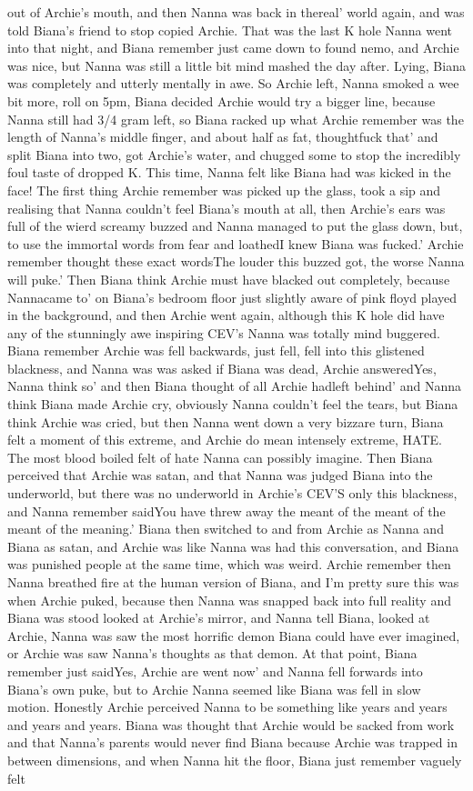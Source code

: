 \documentclass[12pt]{book}
\begin{document}
out of Archie's mouth, and then Nanna was back in thereal' world again, and was told Biana's friend to stop copied Archie. That was the last K hole Nanna went into that night, and Biana remember just came down to found nemo, and Archie was nice, but Nanna was still a little bit mind mashed the day after. Lying, Biana was completely and utterly mentally in awe. So Archie left, Nanna smoked a wee bit more, roll on 5pm, Biana decided Archie would try a bigger line, because Nanna still had 3/4 gram left, so Biana racked up what Archie remember was the length of Nanna's middle finger, and about half as fat, thoughtfuck that' and split Biana into two, got Archie's water, and chugged some to stop the incredibly foul taste of dropped K. This time, Nanna felt like Biana had was kicked in the face! The first thing Archie remember was picked up the glass, took a sip and realising that Nanna couldn't feel Biana's mouth at all, then Archie's ears was full of the wierd screamy buzzed and Nanna managed to put the glass down, but, to use the immortal words from fear and loathedI knew Biana was fucked.' Archie remember thought these exact wordsThe louder this buzzed got, the worse Nanna will puke.' Then Biana think Archie must have blacked out completely, because Nannacame to' on Biana's bedroom floor just slightly aware of pink floyd played in the background, and then Archie went again, although this K hole did have any of the stunningly awe inspiring CEV's Nanna was totally mind buggered. Biana remember Archie was fell backwards, just fell, fell into this glistened blackness, and Nanna was was asked if Biana was dead, Archie answeredYes, Nanna think so' and then Biana thought of all Archie hadleft behind' and Nanna think Biana made Archie cry, obviously Nanna couldn't feel the tears, but Biana think Archie was cried, but then Nanna went down a very bizzare turn, Biana felt a moment of this extreme, and Archie do mean intensely extreme, HATE. The most blood boiled felt of hate Nanna can possibly imagine. Then Biana perceived that Archie was satan, and that Nanna was judged Biana into the underworld, but there was no underworld in Archie's CEV'S only this blackness, and Nanna remember saidYou have threw away the meant of the meant of the meant of the meaning.' Biana then switched to and from Archie as Nanna and Biana as satan, and Archie was like Nanna was had this conversation, and Biana was punished people at the same time, which was weird. Archie remember then Nanna breathed fire at the human version of Biana, and I'm pretty sure this was when Archie puked, because then Nanna was snapped back into full reality and Biana was stood looked at Archie's mirror, and Nanna tell Biana, looked at Archie, Nanna was saw the most horrific demon Biana could have ever imagined, or Archie was saw Nanna's thoughts as that demon. At that point, Biana remember just saidYes, Archie are went now' and Nanna fell forwards into Biana's own puke, but to Archie Nanna seemed like Biana was fell in slow motion. Honestly Archie perceived Nanna to be something like years and years and years and years. Biana was thought that Archie would be sacked from work and that Nanna's parents would never find Biana because Archie was trapped in between dimensions, and when Nanna hit the floor, Biana just remember vaguely felt 
\end{document}
